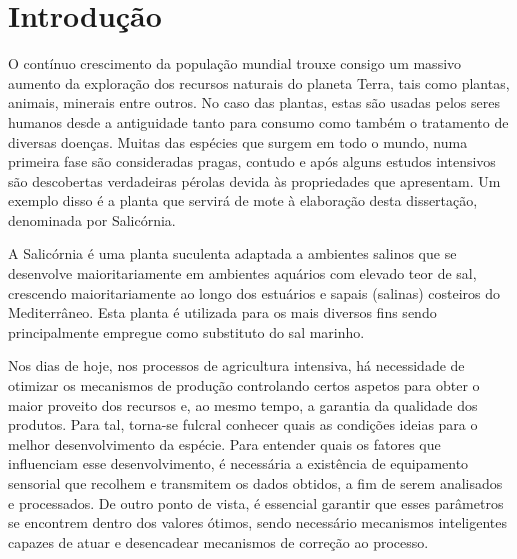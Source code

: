 \chapter{Introdução}



O contínuo crescimento da população mundial trouxe consigo um massivo aumento da exploração dos recursos naturais do planeta Terra, tais como plantas, animais, minerais entre outros. No caso das plantas, estas são usadas pelos seres humanos desde a antiguidade tanto para consumo como também o tratamento de diversas doenças. Muitas das espécies que surgem em todo o mundo, numa primeira fase são consideradas pragas, contudo e após alguns estudos intensivos são descobertas verdadeiras pérolas devida às propriedades que apresentam. Um exemplo disso é a planta que servirá de mote à elaboração desta dissertação, denominada por Salicórnia. 









A Salicórnia é uma planta suculenta adaptada a ambientes salinos que se desenvolve maioritariamente em ambientes aquários com elevado teor de sal, crescendo maioritariamente ao longo dos estuários e sapais (salinas) costeiros do Mediterrâneo. Esta planta é utilizada para os mais diversos fins sendo principalmente empregue como substituto do sal marinho. 


Nos dias de hoje, nos processos de agricultura intensiva, há necessidade de otimizar os mecanismos de produção controlando certos aspetos para obter o maior proveito dos recursos e, ao mesmo tempo, a garantia da qualidade dos produtos. Para tal, torna-se fulcral conhecer quais as condições ideias para o melhor desenvolvimento da espécie. Para entender quais os fatores que influenciam esse desenvolvimento, é necessária a existência de equipamento sensorial que recolhem e transmitem os dados obtidos, a fim de serem analisados e processados. De outro ponto de vista, é essencial garantir que esses parâmetros se encontrem dentro dos valores ótimos, sendo necessário mecanismos inteligentes capazes de atuar e desencadear mecanismos de correção ao processo. 


